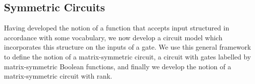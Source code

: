 \documentclass[../paper.tex]{subfiles}
\begin{document}


\subsection{Symmetric Circuits}
Having developed the notion of a function that accepts input structured in
accordance with some vocabulary, we now develop a circuit model which
incorporates this structure on the inputs of a gate. We use this general
framework to define the notion of a matrix-symmetric circuit, a circuit with
gates labelled by matrix-symmetric Boolean functions, and finally we develop the
notion of a matrix-symmetric circuit with rank.

\end{document}
